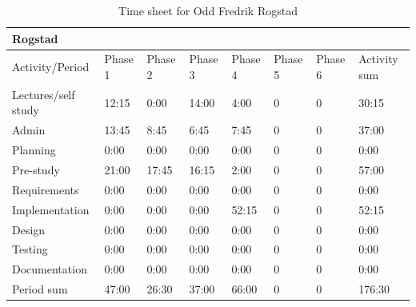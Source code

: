 \documentclass[11pt]{book}
\begin{document}
\begin{table}[H]
\centering
\begin{tabular}{| l | l | l | l | l | l | l | l |}
    \hline
    Rogstad             &          &          &          &          &             &             &              \\ \hline                        
    Activity/Period     & Phase 1  & Phase 2  & Phase  3 & Phase 4  & Phase 5     & Phase 6     & Activity sum \\ \hline
    Lectures/self study & 12:15    & 0:00     & 14:00    & 4:00     & 0           & 0           & 30:15        \\ \hline
    Admin               & 13:45    & 8:45     & 6:45     & 7:45     & 0           & 0           & 37:00        \\ \hline
    Planning            & 0:00     & 0:00     & 0:00     & 0:00     & 0           & 0           & 0:00         \\ \hline
    Pre-study           & 21:00    & 17:45    & 16:15    & 2:00     & 0           & 0           & 57:00        \\ \hline
    Requirements        & 0:00     & 0:00     & 0:00     & 0:00     & 0           & 0           & 0:00         \\ \hline
    Implementation      & 0:00     & 0:00     & 0:00     & 52:15    & 0           & 0           & 52:15        \\ \hline
    Design              & 0:00     & 0:00     & 0:00     & 0:00     & 0           & 0           & 0:00         \\ \hline
    Testing             & 0:00     & 0:00     & 0:00     & 0:00     & 0           & 0           & 0:00         \\ \hline
    Documentation       & 0:00     & 0:00     & 0:00     & 0:00     & 0           & 0           & 0:00         \\ \hline
    Period sum          & 47:00    & 26:30    & 37:00    & 66:00    & 0           & 0           & 176:30       \\ \hline
\end{tabular}
\caption{Time sheet for Odd Fredrik Rogstad}
\label{tab:appendix_timesheets_odd}
\end{table}
\end{document}
